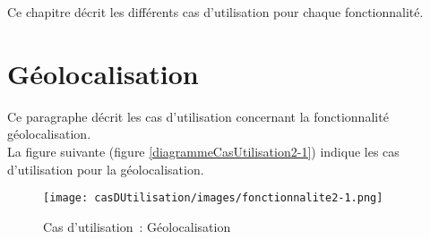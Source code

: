 Ce chapitre décrit les différents cas d'utilisation pour chaque fonctionnalité.


\section{Géolocalisation}
Ce paragraphe décrit les cas d'utilisation concernant la fonctionnalité géolocalisation. \\

La figure suivante (figure \ref{diagrammeCasUtilisation2-1}) indique les cas d'utilisation pour la géolocalisation.
\begin{figure}[H]
	\centering
	\texttt{[image: casDUtilisation/images/fonctionnalite2-1.png]}
	\caption{Cas d'utilisation~: Géolocalisation }
	\label{diagrammeCasUtilisation1-1}
\end{figure}